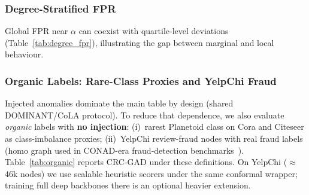 \documentclass[a4paper]{cas-dc}
\theoremstyle{definition}
\begin{document}
\begin{table}[pos=t]
\centering
\caption{CRC-GAD on multiple backbones (mean$\pm$std over 5 seeds; $\alpha=0.05$). From \texttt{extended\_studies.csv}, \texttt{dominant\_pytorch.csv}, and \texttt{conad\_pytorch.csv}. \texttt{conad} is a CONAD-style Siamese+augmentation scorer~\cite{xu2022conad} with validation polarity alignment on Cora/Citeseer/PubMed.}
\label{tab:backbones}
\footnotesize

\end{table}

\subsubsection{Degree-Stratified FPR}
\label{sec:abl_degree}

Global FPR near $\alpha$ can coexist with quartile-level deviations (Table~\ref{tab:degree_fpr}), illustrating the gap between marginal and local behaviour.

\begin{table}[pos=t]
\centering
\caption{Normal-node FPR@0.05 by degree quartile on Cora (mean$\pm$std, 5 seeds).}
\label{tab:degree_fpr}
\footnotesize

\end{table}

\subsubsection{Organic Labels: Rare-Class Proxies and YelpChi Fraud}
\label{sec:abl_organic}

Injected anomalies dominate the main table by design (shared DOMINANT/CoLA protocol). To reduce that dependence, we also evaluate \emph{organic} labels with \textbf{no injection}: (i)~rarest Planetoid class on Cora and Citeseer as class-imbalance proxies; (ii)~YelpChi review-fraud nodes with real fraud labels (homo graph used in CONAD-era fraud-detection benchmarks~\cite{xu2022conad}). Table~\ref{tab:organic} reports CRC-GAD under these definitions. On YelpChi ($\approx$46k nodes) we use scalable heuristic scorers under the same conformal wrapper; training full deep backbones there is an optional heavier extension.

\begin{table}[pos=t]
\centering
\caption{Organic (non-injected) evaluation (mean$\pm$std, 5 seeds, $\alpha=0.05$). Rare-class Planetoid proxies remain near-chance AUC (diagnostic); YelpChi uses real fraud labels with heuristic scorers. FPR near $\alpha$ is the calibration check.}
\label{tab:organic}
\footnotesize
\setlength{\tabcolsep}{4pt}

\end{table}
\end{document}

